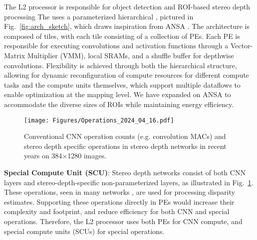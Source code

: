 The L2 processor is responsible for object detection and ROI-based stereo depth processing %
The  uses a parameterized hierarchical , pictured in Fig.~\ref{fig:arch_sketch}, which draws inspiration from ANSA \cite{ansa}.
The architecture is composed of tiles, with each tile consisting of a collection of PEs. 
Each PE is responsible for executing convolutions and activation functions through a Vector-Matrix Multiplier (VMM), local SRAMs, and a shuffle buffer for depthwise convolutions.
Flexibility is achieved through both the hierarchical structure, allowing for dynamic reconfiguration of compute resources for different compute tasks\je{;} and the compute units themselves, which support multiple dataflows to enable optimization at the mapping level.
We have expanded on ANSA to accommodate the diverse sizes of ROIs while maintaining energy efficiency. 

\begin{figure}
    \centering
    \texttt{[image: Figures/Operations\_2024\_04\_16.pdf]}
    \caption{Conventional CNN operation counts (e.g. convolution MACs) and stereo depth specific operations in stereo depth networks in recent years on 384$\times$1280 images.}
    \label{fig:ops_compare}
\end{figure}

\textbf{Special Compute Unit (SCU)}: 
Stereo depth networks consist of both CNN layers and stereo-depth-specific non-parameterized layers, as illustrated in Fig.~\ref{fig:ops_compare}.
These operations, seen in many networks \cite{stereonet, hitnet, tiefenrausch}, are used for processing disparity estimates.
Supporting these operations directly in PEs would increase their complexity and footprint, and reduce efficiency for both CNN and special operations.
Therefore, the \projname{} L2 processor uses both PEs for CNN compute, and special compute units (SCUs) for special operations.

